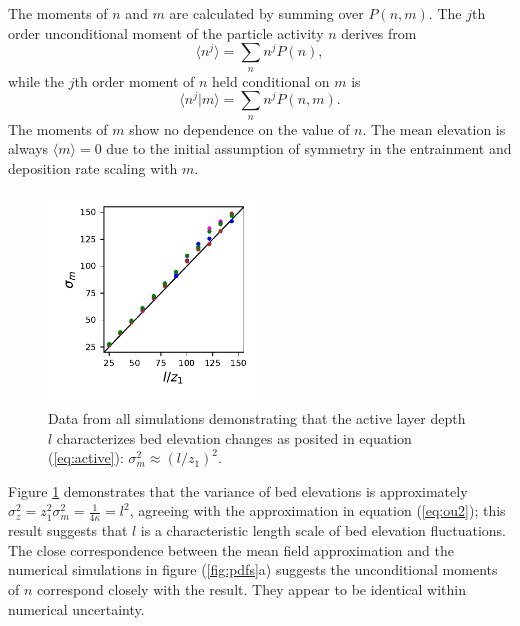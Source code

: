 The moments of $n$ and $m$ are calculated by summing over $P(n,m)$. 
The $j$th order unconditional moment of the particle activity $n$ derives from
\begin{equation} \langle n^j \rangle = \sum_{n}n^jP(n),\end{equation}
while the $j$th order moment of $n$ held conditional on $m$ is
\begin{equation} \langle n^j|m \rangle = \sum_{n}n^j P(n,m) .\end{equation}
The moments of $m$ show no dependence on the value of $n$. 
The mean elevation is always $\langle m \rangle = 0 $ due to the initial assumption of symmetry in the entrainment and deposition rate scaling with $m$. 
\begin{figure}
	\centering
	\includegraphics[width=0.5\textwidth,keepaspectratio]{./figures/ch3/variance.pdf}
	\caption{Data from all simulations demonstrating that the active layer depth $l$ characterizes bed elevation changes as posited in equation (\ref{eq:active}): $\sigma_m^2 \approx (l/z_1)^2$. }
	\label{fig:var}
\end{figure}
Figure \ref{fig:var} demonstrates that the variance of bed elevations is approximately $\sigma_z^2 = z_1^2 \sigma_m^2 = \frac{1}{4\kappa}=l^2$, agreeing with the approximation in equation (\ref{eq:ou2}); this result suggests that $l$ is a characteristic length scale of bed elevation fluctuations.
The close correspondence between the mean field approximation and the numerical simulations in figure (\ref{fig:pdfs}a) suggests the unconditional moments of $n$ correspond closely with the \citet{Ancey2008} result. They appear to be identical within numerical uncertainty.

